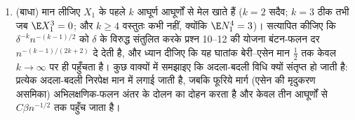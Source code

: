 \begin{problem}[{सप्ताहांत समस्या --- प्रतिस्थापन विधि}]
\begin{enumerate}[resume]
  \item (बाधा) मान लीजिए $X_1$ के पहले $k$ आघूर्ण 
        आघूर्णों से मेल खाते हैं ($k = 2$ सदैव; $k = 3$ ठीक तभी जब
        $\E X_1^3 = 0$; और $k \geq 4$ वस्तुतः कभी नहीं, क्योंकि $\E N_1^4 = 3$)। सत्यापित
        कीजिए कि $\delta^{-k}n^{-(k-1)/2}$ को $\delta$ के विरुद्ध संतुलित करके प्रश्न
        10--12 की योजना बंटन-फलन दर $n^{-(k-1)/(2k+2)}$ दे देती है, और ध्यान
        दीजिए कि यह घातांक बेरी--एसेन मान $\frac12$ तक केवल $k \to
        \infty$ पर
        ही पहुँचता है। कुछ वाक्यों में समझाइए कि अदला-बदली विधि
        क्यों संतृप्त हो जाती है: प्रत्येक अदला-बदली निरपेक्ष मान
        में लगाई जाती है, जबकि फूरिये मार्ग (एसेन की मृदुकरण
        असमिका) अभिलक्षणिक-फलन अंतर के दोलन का दोहन करता है और
        केवल तीन आघूर्णों से $C\beta n^{-1/2}$ तक पहुँच जाता है।
\end{enumerate}


\end{problem}
